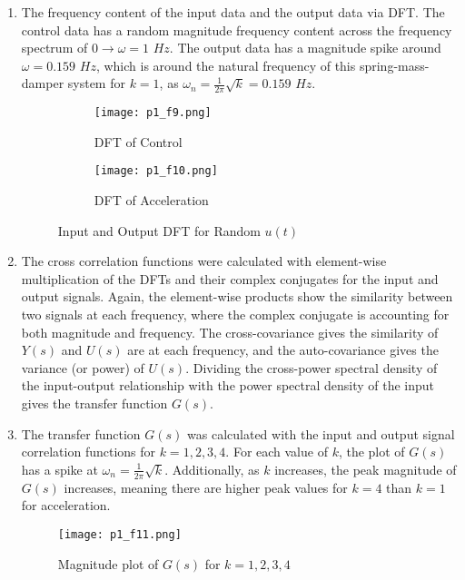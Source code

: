 \documentclass{article}
\begin{document}
\begin{enumerate}
    \newpage 
    \item The frequency content of the input data and the output data via DFT. The control data has a random magnitude frequency content across the frequency spectrum of $0 \rightarrow \omega=1$ $Hz$. The output data has a magnitude spike around $\omega=0.159$ $Hz$, which is around the natural frequency of this spring-mass-damper system for $k=1$, as $\omega_n=\frac{1}{2\pi}\sqrt{k}=0.159$ $Hz$.

    \begin{figure}[h]
    \centering
    \begin{subfigure}{.5\textwidth}
      \centering
      \texttt{[image: p1\_f9.png]}
      \caption{DFT of Control}
      \label{fig:sub1}
    \end{subfigure}%
    \begin{subfigure}{.5\textwidth}
      \centering
      \texttt{[image: p1\_f10.png]}
      \caption{DFT of Acceleration}
      \label{fig:sub2}
    \end{subfigure}
    \caption{Input and Output DFT for Random $u(t)$}
    \label{fig:test}
    \end{figure}
    
    \item The cross correlation functions were calculated with element-wise multiplication of the DFTs and their complex conjugates for the input and output signals. Again, the element-wise products show the similarity between two signals at each frequency, where the complex conjugate is accounting for both magnitude and frequency. The cross-covariance gives the similarity of $Y(s)$ and $U(s)$ are at each frequency, and the auto-covariance gives the variance (or power) of $U(s)$.  Dividing the cross-power spectral density of the input-output relationship with the power spectral density of the input gives the transfer function $G(s)$.


    \item The transfer function $G(s)$ was calculated with the input and output signal correlation functions for $k=1,2,3,4$. For each value of $k$, the plot of $G(s)$ has a spike at $\omega_n=\frac{1}{2\pi}\sqrt{k}$. Additionally, as $k$ increases, the peak magnitude of $G(s)$ increases, meaning there are higher peak values for $k=4$ than $k=1$ for acceleration.

    \begin{figure}[h]
    \centering
    \texttt{[image: p1\_f11.png]}
    \caption{Magnitude plot of $G(s)$ for $k=1,2,3,4$}
    \label{fig:enter-label}
\end{figure}

\end{enumerate}
\end{document}
